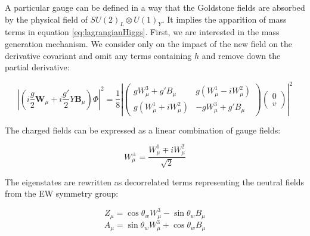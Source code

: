 %
    
    A particular gauge can be defined in a way that the Goldstone fields are absorbed by the physical field of $SU(2)_L \otimes U(1)_Y$.
    It implies the apparition of mass terms in equation \ref{eq:lagrangianHiggs}.
    First, we are interested in the mass generation mechanism.
    We consider only on the impact of the new field on the derivative covariant and omit any terms containing $h$ and remove down the partial derivative:

    \begin{equation}
      \left|\left(i\frac{g}{2}\textbf{W}_{\mu} +i\frac{g'}{2}Y\textbf{B}_{\mu}\right) \Phi \right|^2 = \frac{1}{8}\left|
              \begin{pmatrix}
                 gW^3_{\mu} +g'B_{\mu} & g(W^1_{\mu} - i W^2_{\mu}) \\
                 g(W^1_{\mu} + i W^2_{\mu}) & - g W^3_{\mu} + g'B_{\mu}
              \end{pmatrix}
              \begin{pmatrix}
                0 \\
                v
              \end{pmatrix}
         \right|^2
      \label{eq:derHiggs}
    \end{equation}

    The charged fields can be expressed as a linear combination of gauge fields:

    \begin{equation}
      W^{\pm}_{\mu} = \frac{W^1_{\mu} \mp iW^2_{\mu}}{\sqrt{2}}
    \end{equation}

    The eigenstates are rewritten as decorrelated terms representing the neutral fields from the EW symmetry group:

    \begin{equation}
      Z_{\mu} = \cos{\theta_{w}W^3_{\mu}} - \sin{\theta_{w}B_{\mu}}
    \end{equation}
    \begin{equation}
      A_{\mu} = \sin{\theta_{w}W^3_{\mu}} + \cos{\theta_{w}B_{\mu}}
    \end{equation}

